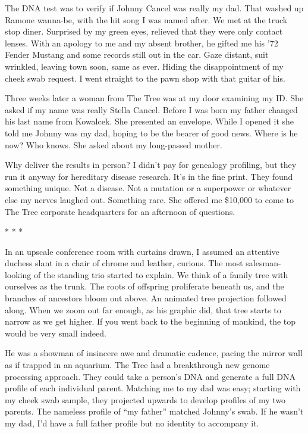 The DNA test was to verify if Johnny Cancel was really my dad. That
washed up Ramone wanna-be, with the hit song I was named after. We met
at the truck stop diner. Surprised by my green eyes, relieved that they
were only contact lenses. With an apology to me and my absent brother,
he gifted me his '72 Fender Mustang and some records still out in the
car. Gaze distant, suit wrinkled, leaving town soon, same as ever.
Hiding the disappointment of my cheek swab request. I went straight to
the pawn shop with that guitar of his.

Three weeks later a woman from The Tree was at my door examining my ID.
She asked if my name was really Stella Cancel. Before I was born my
father changed his last name from Kowalcek. She presented an envelope.
While I opened it she told me Johnny was my dad, hoping to be the bearer
of good news. Where is he now? Who knows. She asked about my long-passed
mother.

Why deliver the results in person? I didn't pay for genealogy profiling,
but they run it anyway for hereditary disease research. It's in the fine
print. They found something unique. Not a disease. Not a mutation or a
superpower or whatever else my nerves laughed out. Something rare. She
offered me \$10,000 to come to The Tree corporate headquarters for an
afternoon of questions.

* * *

In an upscale conference room with curtains drawn, I assumed an
attentive duchess slant in a chair of chrome and leather, curious. The
most salesman-looking of the standing trio started to explain. We think
of a family tree with ourselves as the trunk. The roots of offspring
proliferate beneath us, and the branches of ancestors bloom out above.
An animated tree projection followed along. When we zoom out far enough,
as his graphic did, that tree starts to narrow as we get higher. If you
went back to the beginning of mankind, the top would be very small
indeed.

He was a showman of insincere awe and dramatic cadence, pacing the
mirror wall as if trapped in an aquarium. The Tree had a breakthrough
new genome processing approach. They could take a person's DNA and
generate a full DNA profile of each individual parent. Matching me to my
dad was easy; starting with my cheek swab sample, they projected upwards
to develop profiles of my two parents. The nameless profile of ``my
father'' matched Johnny's swab. If he wasn't my dad, I'd have a full
father profile but no identity to accompany it.

